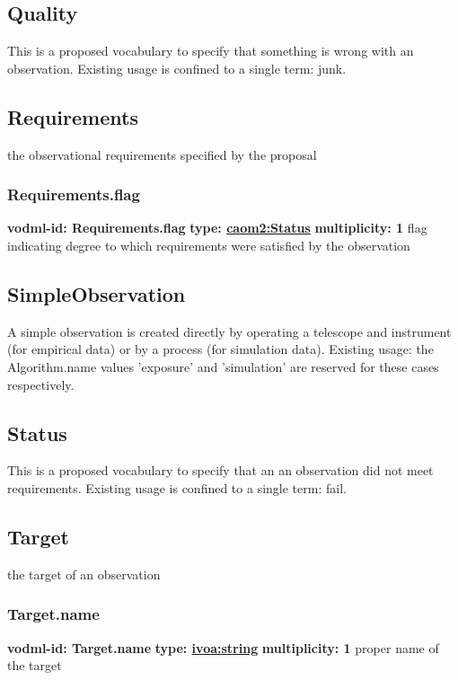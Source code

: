   \subsection{Quality}
  \label{sect:Quality}
    This is a proposed vocabulary to specify that something is wrong with an observation. Existing usage is confined to a single term: junk.

  \subsection{Requirements}
  \label{sect:Requirements}
    the observational requirements specified by the proposal

    \subsubsection{Requirements.flag}
      \textbf{vodml-id: Requirements.flag} \newline
      \textbf{type: \hyperref[sect:Status]{caom2:Status}} \newline
      \textbf{multiplicity: 1} \newline
      flag indicating degree to which requirements were satisfied by the observation

  \subsection{SimpleObservation}
  \label{sect:SimpleObservation}
    A simple observation is created directly by operating a telescope and instrument (for empirical data) or by a process (for simulation data). Existing usage: the Algorithm.name values 'exposure' and 'simulation' are reserved for these cases respectively.

  \subsection{Status}
  \label{sect:Status}
    This is a proposed vocabulary to specify that an an observation did not meet requirements. Existing usage is confined to a single term: fail.

  \subsection{Target}
  \label{sect:Target}
    the target of an observation

    \subsubsection{Target.name}
      \textbf{vodml-id: Target.name} \newline
      \textbf{type: \hyperref[sect:ivoa]{ivoa:string}} \newline
      \textbf{multiplicity: 1} \newline
      proper name of the target

